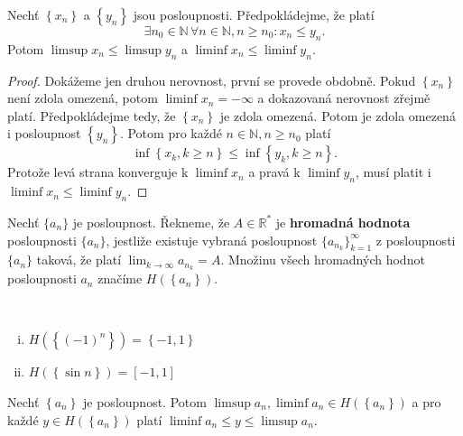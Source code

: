 \begin{veta}\label{veta2.16}
	Nechť $\left \{ x_n \right \} $ a $\left \{ y_n \right \} $ jsou posloupnosti. Předpokládejme, že platí
	$$
	    \exists n_0 \in \mathbb N \, \forall n \in \mathbb N , n \geq n_0: x_n \leq y_n.
	$$
	Potom $\limsup x_n \leq \limsup y_n$ a $\liminf x_n \leq \liminf y_n$.
\end{veta}

\begin{proof}
	Dokážeme jen druhou nerovnost, první se provede obdobně. Pokud $\left \{ x_n \right \} $ není zdola
	omezená, potom $\liminf x_n = -\infty$ a dokazovaná nerovnost zřejmě platí. Předpokládejme tedy,
	že $\left \{ x_n \right \} $ je zdola omezená. Potom je zdola omezená i posloupnost $\left \{ y_n \right \}$.
	Potom pro každé $n \in \mathbb N , n \geq n_0$ platí
	$$
	    \inf \left \{ x_k, k \geq n \right \} \leq \inf \left \{ y_k, k \geq n \right \}.
	$$
	Protože levá strana konverguje k $\liminf x_n$ a pravá k $\liminf y_n$, musí platit i
	$\liminf x_n \leq \liminf y_n$.
\end{proof}

\begin{definice}
Nechť $\{a_n\}$ je posloupnost.
Řekneme, že $A \in \mathbb R ^*$ je \textbf{hromadná hodnota} posloupnosti $\{a_n\}$,
jestliže existuje vybraná posloupnost $\{a_{n_k}\}_{k=1}^{\infty}$
z posloupnosti $\{a_n\}$ taková, že platí
$\lim_{k\to \infty} a_{n_k} = A.$ Množinu všech hromadných hodnot posloupnosti ${a_n}$
značíme $H \left( \left \{ a_n \right \}  \right ) $.
\end{definice}

\begin{priklad}\,
\begin{enumerate}[(i)]
	\item $H \left( \left \{ (-1)^n \right \}  \right )  = \left \{ -1,1 \right \} $
	\item $H \left( \left \{ \sin n \right \}  \right )  = \left [ -1,1 \right ] $
\end{enumerate}
\end{priklad}

\begin{veta}\label{veta2.17}
	Nechť $\left \{ a_n \right \} $ je posloupnost. Potom $\limsup a_n, \liminf a_n \in H \left( \left \{ a_n \right \}  \right ) $
	a pro každé $y \in H \left( \left \{ a_n \right \}  \right ) $ platí $\liminf a_n \leq y \leq \limsup a_n$.
\end{veta}

